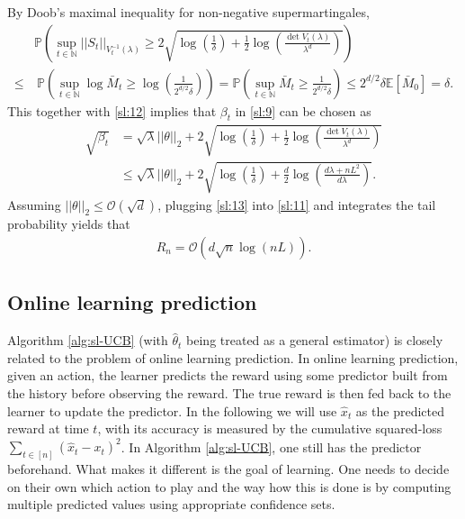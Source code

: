 \documentclass[10pt, openright]{book}
\numberwithin{equation}{section}
\theoremstyle{plain}
\theoremstyle{definition}
\def\N{{\mathbb N}}
\def\E{{\mathbb E}}
\def\P{{\mathbb P}}
\def\t{{\theta}}
\begin{document}
By Doob's maximal inequality for non-negative supermartingales, 
\begin{align*}
&\P\left(\sup_{t\in\N}||S_t||_{V^{-1}_t(\lambda)}\geq 2\sqrt{\log\left(\frac{1}{\delta}\right)+\frac{1}{2}\log\left(\frac{\det V_t(\lambda)}{\lambda^d}\right)}\right)\\
\leq&\ \P\left(\sup_{t\in\N}\log\bar{M}_t\geq\log\left(\frac{1}{2^{d/2}\delta}\right)\right) = \P\left(\sup_{t\in\N}\bar{M}_t\geq \frac{1}{2^{d/2}\delta}\right)\leq 2^{d/2}\delta\E[\bar{M}_0]=\delta. 
\end{align*}
This together with \eqref{sl:12} implies that $\beta_t$ in \eqref{sl:9} can be chosen as 
\begin{align}
\sqrt{\beta_t} &= \sqrt{\lambda}||\t||_2+2\sqrt{\log\left(\frac{1}{\delta}\right)+\frac{1}{2}\log\left(\frac{\det V_t(\lambda)}{\lambda^d}\right)}\nonumber\\
&\leq\sqrt{\lambda}||\t||_2+2\sqrt{\log\left(\frac{1}{\delta}\right)+\frac{d}{2}\log\left(\frac{d\lambda+nL^2}{d\lambda}\right)}\label{sl:13}.
\end{align}
Assuming $||\t||_2\leq\mathcal O(\sqrt{d})$, plugging \eqref{sl:13} into \eqref{sl:11} and integrates the tail probability yields that 
\begin{align*}
R_n = \mathcal O \left(d\sqrt{n}\log (nL)\right).
\end{align*}

\subsection{Online learning prediction}\label{sec:olp}

Algorithm \ref{alg:sl-UCB} (with $\hat{\t}_t$ being treated as a general estimator) is closely related to the problem of online learning prediction. 
In online learning prediction, given an action, the learner predicts the reward using some predictor built from the history before observing the reward. 
The true reward is then fed back to the learner to update the predictor. 
In the following we will use $\hat{x}_t$ as the predicted reward at time $t$, with its accuracy is measured by the cumulative squared-loss $\sum_{t\in [n]}(\hat{x}_t-x_t)^2$. 
In Algorithm \ref{alg:sl-UCB}, one still has the predictor beforehand. What makes it different is the goal of learning. One needs to decide on their own which action to play and the way how this is done is by computing multiple predicted values using appropriate confidence sets. 
\end{document}
